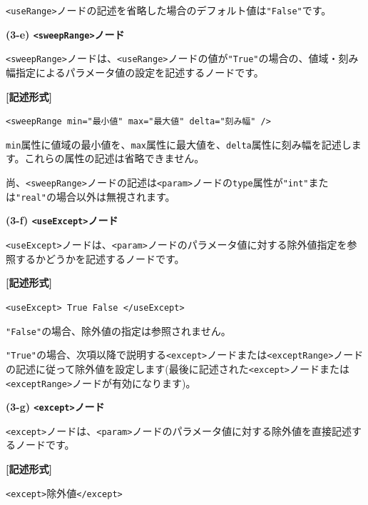 \documentclass[a4paper,11pt]{jarticle}
\begin{document}
{\texttt{<useRange>}ノードの記述を省略した場合のデフォルト値は\texttt{"False"}です。

\vspace{12pt}
\textbf{(3-e) \texttt{<sweepRange>}ノード}

\texttt{<sweepRange>}ノードは、\texttt{<useRange>}ノードの値が\texttt{"True"}の場合の、値域・刻み幅指定によるパラメータ値の設定を記述するノードです。

\vspace{8pt}
\leftskip=12pt
\textbf{[記述形式]}

\leftskip=42pt
\texttt{<sweepRange  min="最小値"  max="最大値"  delta="刻み幅" />}

\vspace{8pt}
\leftskip=0pt
{\tt min}属性に値域の最小値を、{\tt max}属性に最大値を、{\tt delta}属性に刻み幅を記述します。これらの属性の記述は省略できません。

尚、\texttt{<sweepRange>}ノードの記述は\texttt{<param>}ノードの{\tt type}属性が\texttt{"int"}または\texttt{"real"}の場合以外は無視されます。

\vspace{12pt}
\textbf{(3-f) \texttt{<useExcept>}ノード}

\texttt{<useExcept>}ノードは、\texttt{<param>}ノードのパラメータ値に対する除外値指定を参照するかどうかを記述するノードです。

\vspace{8pt}
\leftskip=12pt
\textbf{[記述形式]}

\leftskip=42pt
\texttt{<useExcept> True \textbar{} False </useExcept>}

\vspace{8pt}
\leftskip=0pt
\texttt{"False"}の場合、除外値の指定は参照されません。

\texttt{"True"}の場合、次項以降で説明する\texttt{<except>}ノードまたは\texttt{<exceptRange>}ノードの記述に従って除外値を設定します(最後に記述された\texttt{<except>}ノードまたは\texttt{<exceptRange>}ノードが有効になります)。

\vspace{12pt}
\textbf{(3-g) \texttt{<except>}ノード}

\texttt{<except>}ノードは、\texttt{<param>}ノードのパラメータ値に対する除外値を直接記述するノードです。

\vspace{8pt}
\leftskip=12pt
\textbf{[記述形式]}

\leftskip=42pt
\texttt{<except>}除外値\texttt{</except>}

}
\end{document}
